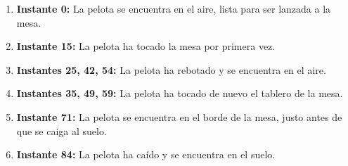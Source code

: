 \documentclass{article}
\begin{document}
\begin{enumerate}
    \item \textbf{Instante 0:} La pelota se encuentra en el aire, lista para ser lanzada a la mesa.
    \item \textbf{Instante 15:} La pelota ha tocado la mesa por primera vez.
    \item \textbf{Instantes 25, 42, 54:} La pelota ha rebotado y se encuentra en el aire.
    \item \textbf{Instantes 35, 49, 59:} La pelota ha tocado de nuevo el tablero de la mesa.
    \item \textbf{Instante 71:} La pelota se encuentra en el borde de la mesa, justo antes de que se caiga al suelo.
    \item \textbf{Instante 84:} La pelota ha caído y se encuentra en el suelo.
\end{enumerate}

\bigskip

\end{document}
